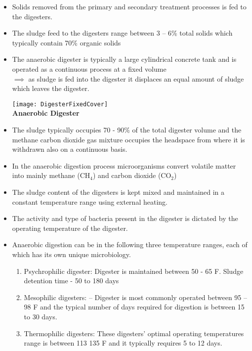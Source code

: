 		\begin{itemize}
		\item Solids removed from the primary and secondary treatment processes is fed to the digesters.  
		\item The sludge feed to the digesters range between 3 – 6\% total solids which typically contain 70\% organic solids
		\item The anaerobic digester is typically a large cylindrical concrete tank and is operated as a continuous process at a fixed volume\\ $\implies$ as sludge is fed into the digester it displaces an equal amount of sludge which leaves the digester.
\begin{center}
\texttt{[image: DigesterFixedCover]}\\
\textbf{Anaerobic Digester}\\
\end{center}
		\item The sludge typically occupies 70 - 90\% of the total digester volume and the methane carbon dioxide gas mixture occupies the headspace from where it is withdrawn also on a continuous basis.
		\item In the anaerobic digestion process microorganisms convert volatile matter into mainly methane (CH$_4$) and carbon dioxide (CO$_2$)
		\item The sludge content of the digesters is kept mixed and maintained in a constant temperature range using external heating.
		\item The activity and type of bacteria present in the digester is dictated by the operating temperature of the digester.
		\item Anaerobic digestion can be in the following three temperature ranges, each of which has its own unique microbiology.\\
			\begin{enumerate}[1. ]
			\item Psychrophilic digester:  Digester is maintained between 50  - 65 F.  Sludge detention time - 50 to 180 days
			\item Mesophilic digesters: – Digester is most commonly operated  between 95 – 98 F and the typical number of days required for digestion is between 15 to 30 days.\\
			\item Thermophilic digesters:  These digesters’ optimal operating temperatures range is between 113   135 F and it typically requires 5 to 12 days.\\

\end{enumerate}
\end{itemize}
